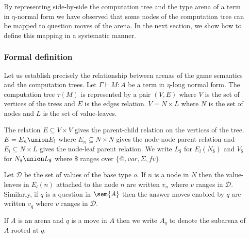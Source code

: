 By representing side-by-side the computation tree and the type arena of a term in $\eta$-normal form we have observed
that some nodes of the computation tree can be mapped to question moves of the arena.
In the next section, we show how to define this mapping in a systematic manner.

\subsubsection{Formal definition}

Let us establish precisely the relationship between arenas of the game semantics
and the computation trees. Let $\Gamma \vdash M : A$ be a term in
$\eta$-long normal form.
The computation tree $\tau(M)$ is represented by a pair $(V,E)$ where
$V$ is the set of vertices of the trees and $E$ is the edges relation.
$V = N \times L$ where $N$ is the set of nodes and $L$ is the set of value-leaves.

The relation $E \subseteq V \times V$ gives the parent-child relation on the vertices of the tree.
$E = E_n \union E_l$ where $E_n \subseteq N \times N$ gives the node-node parent relation and $E_l \subseteq N \times L$ gives the node-leaf parent relation.
We write $L_\$$ for $E_l(N_\$)$
and $V_\$$  for $N_\$ \union L_\$$ where $\$$ ranges over $\{@, var, \Sigma, fv \}$.


Let $\mathcal{D}$ be the set of values of the base type $o$. If $n$
is a node in $N$ then the value-leaves in
$E_l(n)$ attached to the node $n$ are written $v_n$ where $v$ ranges in $\mathcal{D}$.
Similarly, if $q$ is a question in $\sem{A}$ then the answer moves
enabled by $q$ are written $v_q$ where $v$ ranges in $\mathcal{D}$.

If $A$ is an arena and $q$ is a move in $A$ then we write $A_q$ to
denote the subarena of $A$ rooted at $q$.

